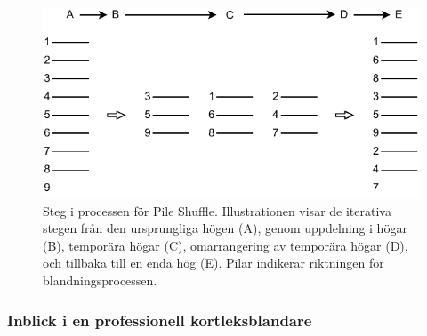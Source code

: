 \documentclass[swedish,a4paper]{article}
\begin{document}
\begin{figure}[H]
	\begin{center}
		\includegraphics{images/pile_shuffle.pdf}
	\end{center}
	\captionsetup{justification=centering,margin=4cm}
	\caption{Steg i processen för Pile Shuffle. Illustrationen visar de
	iterativa stegen från den ursprungliga högen (A), genom uppdelning i
	högar (B), temporära högar (C), omarrangering av temporära högar (D),
	och tillbaka till en enda hög (E). Pilar indikerar riktningen för
	blandningsprocessen.
	}
	\label{fig:pile_shuffle}
\end{figure}


\subsubsection{Inblick i en professionell kortleksblandare}
\label{sec:wheel}
\end{document}
